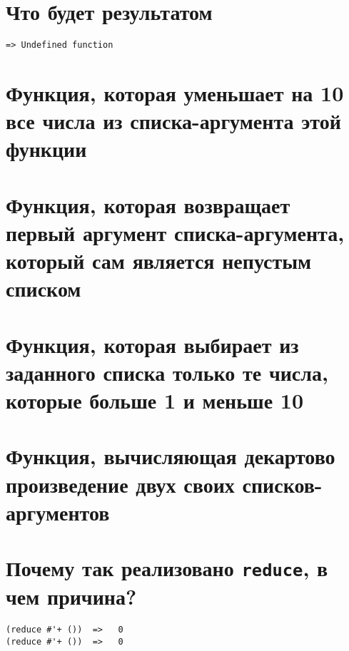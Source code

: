 
\section{Что будет результатом}


\begin{lstlisting}
=> Undefined function
\end{lstlisting}

\section{Функция, которая уменьшает на 10 все числа из списка-аргумента этой функции}




\section{Функция, которая возвращает  первый  аргумент списка-аргумента, который сам является непустым списком}




\section{Функция, которая выбирает из заданного списка только те числа, которые больше 1 и меньше 10}




\section{Функция, вычисляющая декартово произведение двух своих списков-аргументов}




\section{Почему так реализовано \texttt{reduce}, в чем причина?}

\begin{lstlisting}
(reduce #'+ ())  =>   0
(reduce #'+ ())  =>   0
\end{lstlisting}



